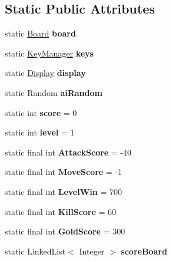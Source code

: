 \subsection*{Static Public Attributes}
\begin{DoxyCompactItemize}
\item 
\mbox{\label{classasciicrawler_1_1Game_a88a2d61444df3841c2d6fbb6f7df8afd}} 
static \hyperlink{classasciicrawler_1_1Board}{Board} {\bfseries board}
\item 
\mbox{\label{classasciicrawler_1_1Game_af4264767479e3f2e395e23e505bc7f24}} 
static \hyperlink{classasciicrawler_1_1KeyManager}{Key\+Manager} {\bfseries keys}
\item 
\mbox{\label{classasciicrawler_1_1Game_a169f0d8231cf07ac0f1dcc12035159e9}} 
static \hyperlink{classasciicrawler_1_1Display}{Display} {\bfseries display}
\item 
\mbox{\label{classasciicrawler_1_1Game_aa82e45424ef5c303711e2f154de64e90}} 
static Random {\bfseries ai\+Random}
\item 
\mbox{\label{classasciicrawler_1_1Game_a58220b697f299e457bbe6963f4010c0c}} 
static int {\bfseries score} = 0
\item 
\mbox{\label{classasciicrawler_1_1Game_a490824e2d8ea8fb6ba08159367f73a68}} 
static int {\bfseries level} = 1
\item 
\mbox{\label{classasciicrawler_1_1Game_a3207bf872db55d678cbb3889694d381d}} 
static final int {\bfseries Attack\+Score} = -\/40
\item 
\mbox{\label{classasciicrawler_1_1Game_a79655e520f3645c8a589689b2b7052dd}} 
static final int {\bfseries Move\+Score} = -\/1
\item 
\mbox{\label{classasciicrawler_1_1Game_a39baf9450132d5991ff1f32e01134b17}} 
static final int {\bfseries Level\+Win} = 700
\item 
\mbox{\label{classasciicrawler_1_1Game_aa5cdd6aaa0bd4f61a134135b0647ce03}} 
static final int {\bfseries Kill\+Score} = 60
\item 
\mbox{\label{classasciicrawler_1_1Game_ace48576550dbbab59420923b516da04f}} 
static final int {\bfseries Gold\+Score} = 300
\item 
\mbox{\label{classasciicrawler_1_1Game_a7e2f14df631aefe04e9f7acd4e39abb2}} 
static Linked\+List$<$ Integer $>$ {\bfseries score\+Board}
\end{DoxyCompactItemize}


